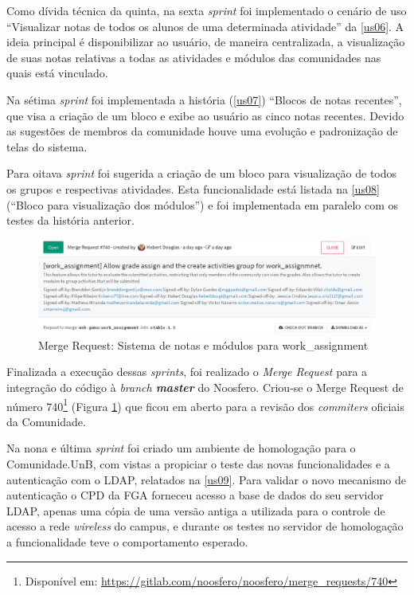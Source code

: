 Como dívida técnica da quinta, na sexta \textit{sprint} foi implementado o cenário de uso ``Visualizar notas de todos os alunos de uma determinada atividade'' da \ref{us06}. A ideia principal é disponibilizar ao usuário, de maneira centralizada, a visualização de suas notas relativas a todas as atividades e módulos das comunidades nas quais está vinculado.

Na sétima \textit{sprint} foi implementada a história (\ref{us07}) ``Blocos de notas recentes'', que visa a criação de um bloco e exibe ao usuário as cinco notas recentes. Devido as sugestões de membros da comunidade houve uma evolução e padronização de telas do sistema.

Para oitava \textit{sprint} foi sugerida a criação de um bloco para visualização de todos os grupos e respectivas atividades. Esta funcionalidade está listada na \ref{us08} (``Bloco para visualização dos módulos'') e foi implementada em paralelo com os testes da história anterior.

\begin{figure}[h]
    \centering
    \includegraphics[keepaspectratio=true,scale=0.42]
      {figuras/merge-740.eps}
    \caption{Merge Request: Sistema de notas e módulos para work\_assignment}
    \label{fig:merge-740}
\end{figure}

Finalizada a execução dessas \textit{sprints}, foi realizado o \textit{Merge Request} para a integração do código à \textit{branch \textbf{master}} do Noosfero. Criou-se o Merge Request de número 740\footnote{Disponível em: \url{https://gitlab.com/noosfero/noosfero/merge_requests/740}} (Figura \ref{fig:merge-740}) que ficou em aberto para a revisão dos \textit{commiters} oficiais da Comunidade.

Na nona e última \textit{sprint} foi criado um ambiente de homologação para o Comunidade.UnB, com vistas a propiciar o teste das novas funcionalidades e a autenticação com o LDAP, relatados na \ref{us09}. Para validar o novo mecanismo de autenticação o CPD da FGA forneceu acesso a base de dados do seu servidor LDAP, apenas uma cópia de uma versão antiga a utilizada para o controle de acesso a rede \textit{wireless} do campus, e durante os testes no servidor de homologação a funcionalidade teve o comportamento esperado.

